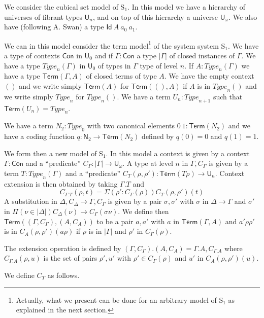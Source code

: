 \documentclass[10pt,a4paper]{article}
\newcommand{\Id}{\mathsf{Id}}
\def\NN{\mathsf{N}}
\def\UU{\mathsf{U}}
\def\Type{{Type}}
\def\Con{\mathsf{Con}}
\def\Term{\mathsf{Term}}
\newcommand{\Elem}{\mathsf{Term}}
\begin{document}
 We consider the cubical set model of S$_1$. In this model we have a hierarchy
of universes of fibrant types $\UU_n$, and on top of this hierarchy a universe
$\UU_{\omega}$. We also have (following A. Swan) a type $\Id~A~a_0~a_1$.

 We can in this model consider the term model\footnote{Actually, what we present can be done
for an arbitrary model of S$_1$ as explained in the next section.} of the system system S$_1$. 
We have a type of contexts $\Con$ in $\UU_0$ and if $\Gamma:\Con$ a type $|\Gamma|$ of closed
instances of $\Gamma$. 
We have a type $\Type_n(\Gamma)$ in $\UU_0$ of types in $\Gamma$
type of level $n$. If $A:\Type_n(\Gamma)$ we have a type $\Term(\Gamma,A)$ of closed terms of type $A$.
We have the empty context $()$ and we write simply $\Term(A)$ for $\Term((),A)$ if $A$ is
in $\Type_n()$ and we write simply $\Type_n$ for $\Type_n()$.
We have a term $U_n:\Type_{n+1}$ such that $\Term(U_n) = \Type_n$.

 We have a term $N_2:\Type_0$ with two canonical elements $0~1:\Term(N_2)$
and we have a coding function $q:\NN_2\rightarrow \Term(N_2)$
defined by $q(0) = 0$ and $q(1) = 1$.

 We form then a new model of S$_1$. In this model a context is given by a context $\Gamma:\Con$
and a ``predicate'' $C_{\Gamma}:|\Gamma|\rightarrow \UU_{\omega}$.
A type at level $n$ in $\Gamma,C_{\Gamma}$ is given by 
a term $T:\Type_n(\Gamma)$ and a ``predicate'' $C_T(\rho,\rho'):\Term(T\rho)\rightarrow \UU_n$. 
Context extension is then obtained by taking $\Gamma.T$ and 
$$C_{\Gamma.T}(\rho,t) = \Sigma (\rho':C_{\Gamma}(\rho))C_{T}(\rho,\rho')(t)$$
A substitution in $\Delta,C_{\Delta}\rightarrow \Gamma,C_{\Gamma}$ is given by
a pair $\sigma,\sigma'$ with $\sigma$ in $\Delta\rightarrow\Gamma$ and
$\sigma'$ in $\Pi (\nu\in |\Delta|)C_{\Delta}(\nu)\rightarrow C_{\Gamma}(\sigma\nu)$.
We define then $\Elem((\Gamma,C_{\Gamma}),(A,C_A))$ to be a pair $a,a'$
with $a$ in $\Elem(\Gamma,A)$ and $a'\rho\rho'$ is in $C_{A}(\rho,\rho')(a\rho)$
if $\rho$ is in $|\Gamma|$ and $\rho'$ in $C_{\Gamma}(\rho)$.

 The extension operation is defined by $(\Gamma,C_{\Gamma}).(A,C_A) = \Gamma.A,C_{\Gamma.A}$
where $C_{\Gamma.A}(\rho,u)$ is the set of pairs $\rho',u'$
with $\rho'\in C_{\Gamma}(\rho)$ and $u'$ in $C_A(\rho,\rho')(u)$.

\medskip

We define $C_T$ as follows.

\medskip
\end{document}
